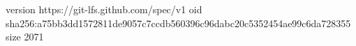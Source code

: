 version https://git-lfs.github.com/spec/v1
oid sha256:a75bb3dd1572811de9057c7ccdb560396c96dabc20c5352454ae99c6da728355
size 2071
